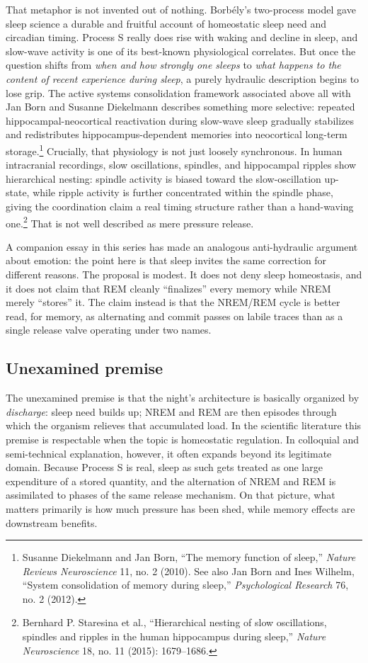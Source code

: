 \documentclass[11pt]{article}
\begin{document}
That metaphor is not invented out of nothing. Borb\'ely's two-process model gave sleep science a durable and fruitful account of homeostatic sleep need and circadian timing. Process S really does rise with waking and decline in sleep, and slow-wave activity is one of its best-known physiological correlates. But once the question shifts from \emph{when and how strongly one sleeps} to \emph{what happens to the content of recent experience during sleep}, a purely hydraulic description begins to lose grip. The active systems consolidation framework associated above all with Jan Born and Susanne Diekelmann describes something more selective: repeated hippocampal-neocortical reactivation during slow-wave sleep gradually stabilizes and redistributes hippocampus-dependent memories into neocortical long-term storage.\footnote{Susanne Diekelmann and Jan Born, ``The memory function of sleep,'' \emph{Nature Reviews Neuroscience} 11, no. 2 (2010). See also Jan Born and Ines Wilhelm, ``System consolidation of memory during sleep,'' \emph{Psychological Research} 76, no. 2 (2012).} Crucially, that physiology is not just loosely synchronous. In human intracranial recordings, slow oscillations, spindles, and hippocampal ripples show hierarchical nesting: spindle activity is biased toward the slow-oscillation up-state, while ripple activity is further concentrated within the spindle phase, giving the coordination claim a real timing structure rather than a hand-waving one.\footnote{Bernhard P. Staresina et al., ``Hierarchical nesting of slow oscillations, spindles and ripples in the human hippocampus during sleep,'' \emph{Nature Neuroscience} 18, no. 11 (2015): 1679--1686.} That is not well described as mere pressure release.

A companion essay in this series has made an analogous anti-hydraulic argument about emotion: the point here is that sleep invites the same correction for different reasons. The proposal is modest. It does not deny sleep homeostasis, and it does not claim that REM cleanly ``finalizes'' every memory while NREM merely ``stores'' it. The claim instead is that the NREM/REM cycle is better read, for memory, as alternating \repair and commit passes on labile traces than as a single release valve operating under two names.

\subsection*{Unexamined premise}
The unexamined premise is that the night's architecture is basically organized by \emph{discharge}: sleep need builds up; NREM and REM are then episodes through which the organism relieves that accumulated load. In the scientific literature this premise is respectable when the topic is homeostatic regulation. In colloquial and semi-technical explanation, however, it often expands beyond its legitimate domain. Because Process S is real, sleep as such gets treated as one large expenditure of a stored quantity, and the alternation of NREM and REM is assimilated to phases of the same release mechanism. On that picture, what matters primarily is how much pressure has been shed, while memory effects are downstream benefits.
\end{document}
